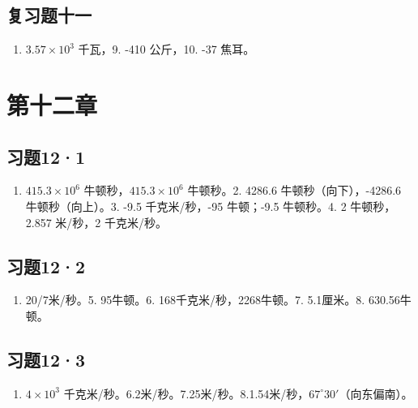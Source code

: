 \subsection{复习题十一}\label{ux590dux4e60ux9898ux5341ux4e00-1}

\begin{enumerate}
\def\labelenumi{\arabic{enumi}.}
\setcounter{enumi}{7}
\tightlist
\item
  \(3.57 \times 10^{3}\) 千瓦，9. -410 公斤，10. -37 焦耳。
\end{enumerate}

\section{第十二章}\label{ux7b2cux5341ux4e8cux7ae0}

\subsection{习题12·1}\label{ux4e60ux9898121-1}

\begin{enumerate}
\def\labelenumi{\arabic{enumi}.}
\tightlist
\item
  \(415.3 \times 10^{6}\) 牛顿秒，\(415.3 \times 10^{6}\) 牛顿秒。2.
  4286.6 牛顿秒（向下），-4286.6 牛顿秒（向上）。3. -9.5 千克米/秒，-95
  牛顿；-9.5 牛顿秒。4. 2 牛顿秒，2.857 米/秒，2 千克米/秒。
\end{enumerate}

\subsection{习题12·2}\label{ux4e60ux9898122-1}

\begin{enumerate}
\def\labelenumi{\arabic{enumi}.}
\setcounter{enumi}{3}
\tightlist
\item
  20/7米/秒。5. 95牛顿。6. 168千克米/秒，2268牛顿。7. 5.1厘米。8.
  630.56牛顿。
\end{enumerate}

\subsection{习题12·3}\label{ux4e60ux9898123-1}

\begin{enumerate}
\def\labelenumi{\arabic{enumi}.}
\setcounter{enumi}{1}
\tightlist
\item
  \(4 \times 10^{3}\)
  千克米/秒。6.2米/秒。7.25米/秒。8.1.54米/秒，\(67^{\circ}30'\)（向东偏南）。
\end{enumerate}

